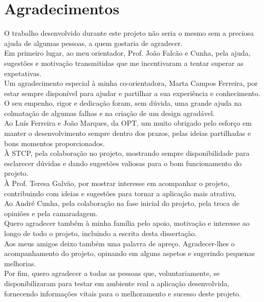 \chapter*{Agradecimentos}

O trabalho desenvolvido durante este projeto não seria o mesmo sem a preciosa ajuda de algumas pessoas, a quem gostaria de agradecer.
\\Em primeiro lugar, ao meu orientador, Prof. João Falcão e Cunha, pela ajuda, sugestões e motivação transmitidas que me incentivaram a tentar superar as expetativas.
\\Um agradecimento especial à minha co-orientadora, Marta Campos Ferreira, por estar sempre disponível para ajudar e partilhar a sua experiência e conhecimento. O seu empenho, rigor e dedicação foram, sem dúvida, uma grande ajuda na colmatação de algumas falhas e na criação de um design agradável.
\\Ao Luís Ferreira e João Marques, da OPT, um muito obrigado pelo esforço em manter o desenvolvimento sempre dentro dos prazos, pelas ideias partilhadas e bons momentos proporcionados.
\\À STCP, pela colaboração no projeto, mostrando sempre disponibilidade para esclarecer dúvidas e dando sugestões valiosas para o bom funcionamento do projeto.
\\À Prof. Teresa Galvão, por mostrar interesse em acompanhar o projeto, contribuindo com ideias e sugestões para tornar a aplicação mais atrativa.
\\Ao André Cunha, pela colaboração na fase inicial do projeto, pela troca de opiniões e pela camaradagem.
\\Quero agradecer também à minha família pelo apoio, motivação e interesse ao longo de todo o projeto, incluindo a escrita desta dissertação.
\\Aos meus amigos deixo também uma palavra de apreço. Agradecer-lhes o acompanhamento do projeto, opinando em alguns aspetos e sugerindo pequenas melhorias.
\\Por fim, quero agradecer a todas as pessoas que, voluntariamente, se disponibilizaram para testar em ambiente real a aplicação desenvolvida, fornecendo informações vitais para o melhoramento e sucesso deste projeto.

\vspace{10mm}
